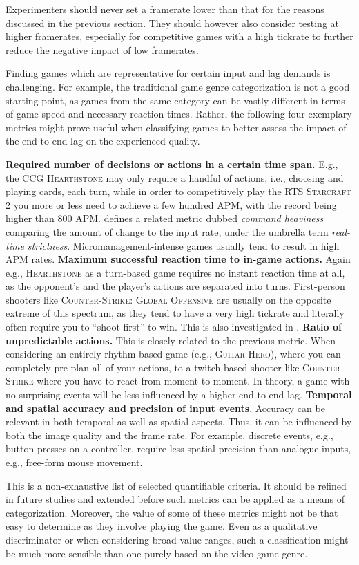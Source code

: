 Experimenters should never set a framerate lower than that for the reasons discussed in the previous section. They should however also consider testing at higher framerates, especially for competitive games with a high tickrate to further reduce the negative impact of low framerates.

Finding games which are representative for certain input and lag demands is challenging. For example, the traditional game genre categorization is not a good starting point, as games from the same category can be vastly different in terms of game speed and necessary reaction times. Rather, the following four exemplary metrics might prove useful when classifying games to better assess the impact of the end-to-end lag on the experienced quality.

\textbf{Required number of decisions or actions in a certain time span.} E.g., the \gls{CCG} \textsc{Hearthstone} may only require a handful of actions, i.e., choosing and playing cards, each turn, while in order to competitively play the \gls{RTS} \textsc{Starcraft 2} you more or less need to achieve a few hundred \gls{APM}, with the record being higher than $800$ \gls{APM}. \cite{6404025} defines a related metric dubbed \textit{command heaviness} comparing the amount of change to the input rate, under the umbrella term \textit{real-time strictness}. Micromanagement-intense games usually tend to result in high \gls{APM} rates.
\textbf{Maximum successful reaction time to in-game actions.} Again e.g., \textsc{Hearthstone} as a turn-based game requires no instant reaction time at all, as the opponent's and the player's actions are separated into turns. First-person shooters like \textsc{Counter-Strike: Global Offensive} are usually on the opposite extreme of this spectrum, as they tend to have a very high tickrate and literally often require you to ``shoot first'' to win. This is also investigated in \cite{Claypool:2006:LPA:1167838.1167860}.
\textbf{Ratio of unpredictable actions.} This is closely related to the previous metric. When considering an entirely rhythm-based game (e.g., \textsc{Guitar Hero}), where you can completely pre-plan all of your actions, to a twitch-based shooter like \textsc{Counter-Strike} where you have to react from moment to moment. In theory, a game with no surprising events will be less influenced by a higher end-to-end lag.
\textbf{Temporal and spatial accuracy and precision of input events}. Accuracy can be relevant in both temporal as well as spatial aspects. Thus, it can be influenced by both the image quality and the frame rate. For example, discrete events, e.g., button-presses on a controller, require less spatial precision than analogue inputs, e.g., free-form mouse movement.

This is a non-exhaustive list of selected quantifiable criteria. It should be refined in future studies and extended before such metrics can be applied as a means of categorization. Moreover, the value of some of these metrics might not be that easy to determine as they involve playing the game. Even as a qualitative discriminator or when considering broad value ranges, such a classification might be much more sensible than one purely based on the video game genre.